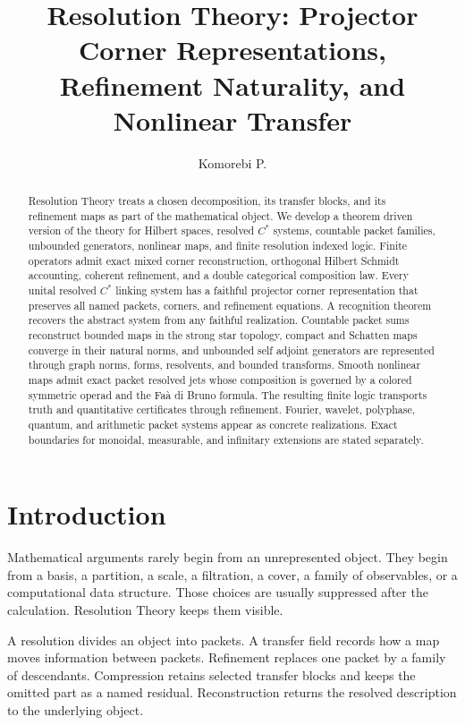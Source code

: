 \documentclass{aomart}
\title[Resolution Theory]{Resolution Theory: Projector Corner Representations, Refinement Naturality, and Nonlinear Transfer}
\author[Komorebi P.]{Komorebi P.}
\theoremstyle{definition}
\theoremstyle{remark}
\begin{document}
\begin{abstract}
Resolution Theory treats a chosen decomposition, its transfer blocks, and its refinement maps as part of the mathematical object. We develop a theorem driven version of the theory for Hilbert spaces, resolved \(C^*\) systems, countable packet families, unbounded generators, nonlinear maps, and finite resolution indexed logic. Finite operators admit exact mixed corner reconstruction, orthogonal Hilbert Schmidt accounting, coherent refinement, and a double categorical composition law. Every unital resolved \(C^*\) linking system has a faithful projector corner representation that preserves all named packets, corners, and refinement equations. A recognition theorem recovers the abstract system from any faithful realization. Countable packet sums reconstruct bounded maps in the strong star topology, compact and Schatten maps converge in their natural norms, and unbounded self adjoint generators are represented through graph norms, forms, resolvents, and bounded transforms. Smooth nonlinear maps admit exact packet resolved jets whose composition is governed by a colored symmetric operad and the Faà di Bruno formula. The resulting finite logic transports truth and quantitative certificates through refinement. Fourier, wavelet, polyphase, quantum, and arithmetic packet systems appear as concrete realizations. Exact boundaries for monoidal, measurable, and infinitary extensions are stated separately.
\end{abstract}
\maketitle
\thispagestyle{plain}

\section{Introduction}\label{sec:introduction}

Mathematical arguments rarely begin from an unrepresented object. They begin from a basis, a partition, a scale, a filtration, a cover, a family of observables, or a computational data structure. Those choices are usually suppressed after the calculation. Resolution Theory keeps them visible.

A resolution divides an object into packets. A transfer field records how a map moves information between packets. Refinement replaces one packet by a family of descendants. Compression retains selected transfer blocks and keeps the omitted part as a named residual. Reconstruction returns the resolved description to the underlying object.
\end{document}
